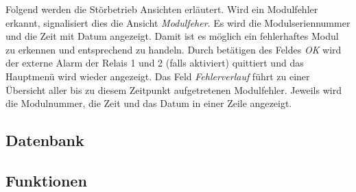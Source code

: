 Folgend werden  die St\"orbetrieb Ansichten erl\"autert. Wird  ein Modulfehler
erkannt,  signalisiert   dies  die  Ansicht  \emph{Modulfeher}. Es   wird  die
Modulseriennummer und die Zeit mit Datum angezeigt. Damit ist es m\"oglich ein
fehlerhaftes Modul zu erkennen  und entsprechend zu handeln. Durch bet\"atigen
des  Feldes  \emph{OK} wird  der  externe  Alarm der  Relais  1  und 2  (falls
aktiviert)  quittiert  und das  Hauptmen\"u  wird  wieder angezeigt. Das  Feld
\emph{Fehlerverlauf}  f\"uhrt  zu  einer   \"Ubersicht  aller  bis  zu  diesem
Zeitpunkt aufgetretenen  Modulfehler. Jeweils wird  die Modulnummer,  die Zeit
und das Datum in einer Zeile angezeigt.


\subsection{Datenbank}
\label{subsec:software:master:database}

\subsection{Funktionen}
\label{subsec:software:master:functions}

